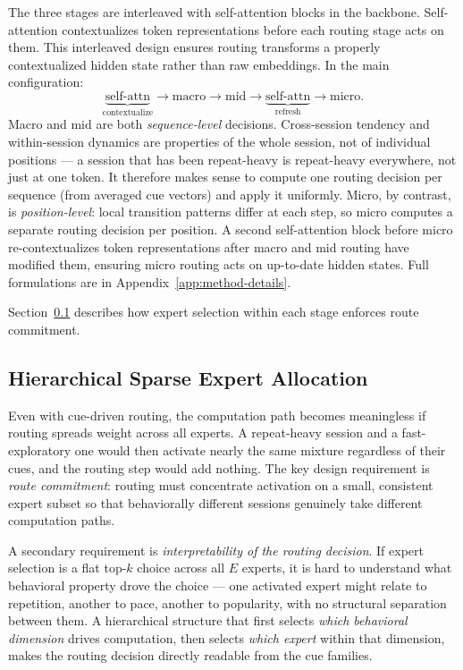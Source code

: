 \documentclass[sigconf,review,anonymous]{acmart}
\begin{document}
The three stages are interleaved with self-attention blocks in the backbone. Self-attention contextualizes token representations before each routing stage acts on them. This interleaved design ensures routing transforms a properly contextualized hidden state rather than raw embeddings. In the main configuration:
\[
\underbrace{\text{self-attn}}_{\text{contextualize}} \to \text{macro} \to \text{mid} \to \underbrace{\text{self-attn}}_{\text{refresh}} \to \text{micro}.
\]
Macro and mid are both \emph{sequence-level} decisions. Cross-session tendency and within-session dynamics are properties of the whole session, not of individual positions --- a session that has been repeat-heavy is repeat-heavy everywhere, not just at one token. It therefore makes sense to compute one routing decision per sequence (from averaged cue vectors) and apply it uniformly. Micro, by contrast, is \emph{position-level}: local transition patterns differ at each step, so micro computes a separate routing decision per position. A second self-attention block before micro re-contextualizes token representations after macro and mid routing have modified them, ensuring micro routing acts on up-to-date hidden states. Full formulations are in Appendix~\ref{app:method-details}.

Section~\ref{sec:hierarchical-routing} describes how expert selection within each stage enforces route commitment.

\subsection{Hierarchical Sparse Expert Allocation}
\label{sec:hierarchical-routing}

Even with cue-driven routing, the computation path becomes meaningless if routing spreads weight across all experts. A repeat-heavy session and a fast-exploratory one would then activate nearly the same mixture regardless of their cues, and the routing step would add nothing. The key design requirement is \emph{route commitment}: routing must concentrate activation on a small, consistent expert subset so that behaviorally different sessions genuinely take different computation paths.

A secondary requirement is \emph{interpretability of the routing decision}. If expert selection is a flat top-$k$ choice across all $E$ experts, it is hard to understand what behavioral property drove the choice --- one activated expert might relate to repetition, another to pace, another to popularity, with no structural separation between them. A hierarchical structure that first selects \emph{which behavioral dimension} drives computation, then selects \emph{which expert} within that dimension, makes the routing decision directly readable from the cue families.
\end{document}
